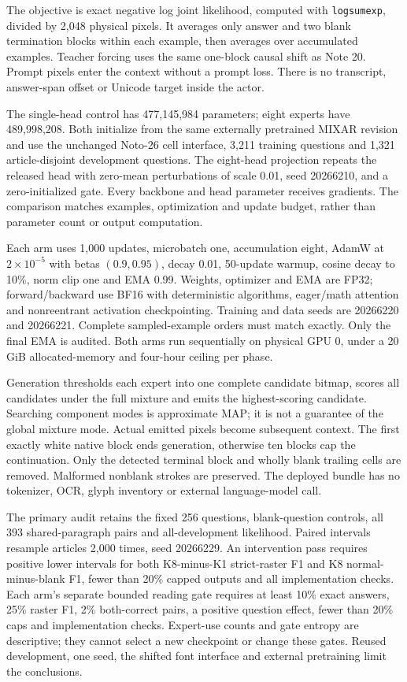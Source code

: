 \documentclass[10pt,a4paper]{article}
\begin{document}
The objective is exact negative log joint likelihood, computed with
\texttt{logsumexp}, divided by 2,048 physical pixels. It averages only
answer and two blank termination blocks within each example, then averages
over accumulated examples. Teacher forcing uses the same one-block causal
shift as Note 20. Prompt pixels enter the context without a prompt loss.
There is no transcript, answer-span offset or Unicode target inside the actor.

The single-head control has 477,145,984 parameters; eight experts have
489,998,208. Both initialize from the same externally pretrained MIXAR
revision and use the unchanged Noto-26 cell interface, 3,211 training
questions and 1,321 article-disjoint development questions. The eight-head
projection repeats the released head with zero-mean perturbations of scale
0.01, seed 20266210, and a zero-initialized gate. Every backbone and head
parameter receives gradients. The comparison matches examples, optimization
and update budget, rather than parameter count or output computation.

Each arm uses 1,000 updates, microbatch one, accumulation eight, AdamW at
$2\times10^{-5}$ with betas $(0.9,0.95)$, decay 0.01, 50-update warmup,
cosine decay to 10\%, norm clip one and EMA 0.99. Weights, optimizer and EMA
are FP32; forward/backward use BF16 with deterministic algorithms, eager/math
attention and nonreentrant activation checkpointing. Training and data seeds
are 20266220 and 20266221. Complete sampled-example orders must match exactly.
Only the final EMA is audited. Both arms run sequentially on physical GPU 0,
under a 20 GiB allocated-memory and four-hour ceiling per phase.

Generation thresholds each expert into one complete candidate bitmap, scores
all candidates under the full mixture and emits the highest-scoring candidate.
Searching component modes is approximate MAP; it is not a guarantee of the
global mixture mode. Actual emitted pixels become subsequent context. The
first exactly white native block ends generation, otherwise ten blocks cap
the continuation. Only the detected terminal block and wholly blank trailing
cells are removed. Malformed nonblank strokes are preserved. The deployed
bundle has no tokenizer, OCR, glyph inventory or external language-model call.

The primary audit retains the fixed 256 questions, blank-question controls,
all 393 shared-paragraph pairs and all-development likelihood. Paired
intervals resample articles 2,000 times, seed 20266229. An intervention pass
requires positive lower intervals for both K8-minus-K1 strict-raster F1 and
K8 normal-minus-blank F1, fewer than 20\% capped outputs and all implementation
checks. Each arm's separate bounded reading gate requires at least 10\%
exact answers, 25\% raster F1, 2\% both-correct pairs, a positive question
effect, fewer than 20\% caps and implementation checks. Expert-use counts
and gate entropy are descriptive; they cannot select a new checkpoint or
change these gates. Reused development, one seed, the shifted font interface
and external pretraining limit the conclusions.
\end{document}
